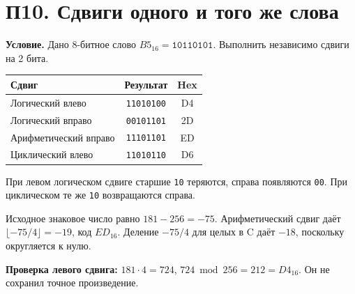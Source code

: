 \section{П10. Сдвиги одного и того же слова}\label{ex:p10}
\textbf{Условие.} Дано 8-битное слово $B5_{16}=\texttt{10110101}$.
Выполнить независимо сдвиги на 2 бита.

\begin{center}
\begin{tabular}{l|c|c}
Сдвиг & Результат & Hex\\\hline
Логический влево & \texttt{11010100} & D4\\
Логический вправо & \texttt{00101101} & 2D\\
Арифметический вправо & \texttt{11101101} & ED\\
Циклический влево & \texttt{11010110} & D6
\end{tabular}
\end{center}
При левом логическом сдвиге старшие \texttt{10} теряются, справа появляются \texttt{00}. При циклическом те же \texttt{10} возвращаются справа.

Исходное знаковое число равно $181-256=-75$. Арифметический сдвиг даёт $\lfloor-75/4\rfloor=-19$, код $ED_{16}$. Деление $-75/4$ для целых в C даёт $-18$, поскольку округляется к нулю.

\textbf{Проверка левого сдвига:} $181\cdot4=724$, $724\bmod256=212=D4_{16}$. Он не сохранил точное произведение.
